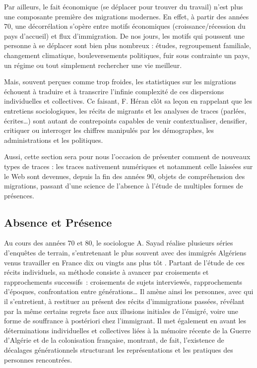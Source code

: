 \documentclass[symmetric,justified,marginals=raggedouter]{tufte-book}
\begin{document}
Par ailleurs, le fait économique (se déplacer pour trouver du travail) n'est plus une composante première des migrations modernes. En effet, à partir des années 70, une décorrélation s'opère entre motifs économiques (croissance/récession du pays d'accueil) et flux d'immi\-gration. De nos jours, les motifs qui poussent une personne à se déplacer sont bien plus nombreux : études, regroupement familiale, changement climatique, bouleversements politiques, fuir sous contrain\-te un pays, un régime ou tout simplement rechercher une vie meilleur.   

Mais, souvent perçues comme trop froides, les statistiques sur les migrations échouent à traduire et à transcrire l'infinie complexité de ces dispersions individuelles et collectives. Ce faisant, F. Héran clôt sa leçon en rappelant que les entretiens sociologiques, les récits de migrants et les analyses de traces (parlées, écrites\ldots{}) sont autant de contrepoints capables de venir contextualiser, densifier, critiquer ou interroger les chiffres manipulés par les démographes, les administrations et les politiques.

Aussi, cette section sera pour nous l'occasion de présenter comment de nouveaux types de traces : les traces nativement numériques et notamment celle laissées sur le Web sont devenues, depuis la fin des années 90, objets de compréhension des migrations, passant d'une science de l'absence à l'étude de multiples formes de présences.  

\subsection{Absence et Présence}

Au cours des années 70 et 80, le sociologue A. Sayad réalise plusieurs séries d'enquêtes de terrain, s'entretenant le plus souvent avec des immigrés Algériens venus travailler en France dix ou vingts ans plus tôt \citep{sayad_double_1999}. Partant de l'étude de ces récits individuels, sa méthode consiste à avancer par croisements et rapprochements successifs~: croisements de sujets interviewés, rapprochements d'époques, confrontation entre générations\ldots{} Il amène ainsi les personnes, avec qui il s'entretient, à restituer au présent des récits d'immigrations passées, révélant par la même certains regrets face aux illusions initiales de l'émigré, voire une forme de souffrance à postériori chez l'immigrant. Il met également en avant les déterminations individuelles et collectives liées à la mémoire récente de la Guerre d'Algérie et de la colonisation française, montrant, de fait, l'existence de décalages générationnels structurant les représentations et les pratiques des personnes rencontrées.  
\end{document}
